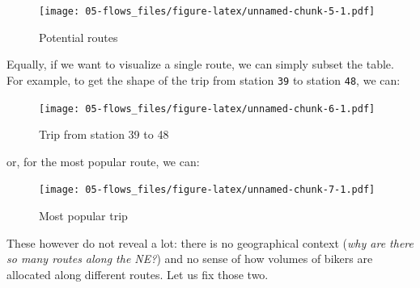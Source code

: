 \documentclass[
]{book}
\newenvironment{Shaded}{\begin{snugshade}}{\end{snugshade}}
\newcommand{\DecValTok}[1]{\textcolor[rgb]{0.00,0.00,0.81}{#1}}
\newcommand{\FunctionTok}[1]{\textcolor[rgb]{0.00,0.00,0.00}{#1}}
\newcommand{\NormalTok}[1]{#1}
\newcommand{\OtherTok}[1]{\textcolor[rgb]{0.56,0.35,0.01}{#1}}
\newcommand{\SpecialCharTok}[1]{\textcolor[rgb]{0.00,0.00,0.00}{#1}}
\begin{document}
\begin{figure}
\centering
\texttt{[image: 05-flows\_files/figure-latex/unnamed-chunk-5-1.pdf]}
\caption{\label{fig:unnamed-chunk-5}Potential routes}
\end{figure}

Equally, if we want to visualize a single route, we can simply subset the table. For example, to get the shape of the trip from station \texttt{39} to station \texttt{48}, we can:

\begin{Shaded}
\end{Shaded}

\begin{figure}
\centering
\texttt{[image: 05-flows\_files/figure-latex/unnamed-chunk-6-1.pdf]}
\caption{\label{fig:unnamed-chunk-6}Trip from station 39 to 48}
\end{figure}

or, for the most popular route, we can:

\begin{Shaded}
\end{Shaded}

\begin{figure}
\centering
\texttt{[image: 05-flows\_files/figure-latex/unnamed-chunk-7-1.pdf]}
\caption{\label{fig:unnamed-chunk-7}Most popular trip}
\end{figure}

These however do not reveal a lot: there is no geographical context (\emph{why are there so many routes along the NE?}) and no sense of how volumes of bikers are allocated along different routes. Let us fix those two.
\end{document}

